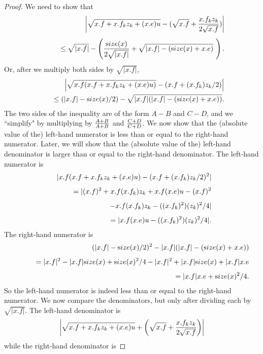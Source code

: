 {\begin{proof}{}
We need to show that 
\begin{eqnarray*}
&&\hskip-35pt \left|\sqrt {x.f + x.f_k z_k + (x.e) u} - (\sqrt{x.f} + {x.f_k z_k\over 2 \sqrt {x.f}})\right|\\[4pt]
&&\qquad \le \sqrt{|x.f|} - \left({{\textrm size}(x) \over 2 \sqrt {|x.f|}} + \sqrt {|x.f| - ({\textrm size}(x) + x.e)}\ \right).
\end{eqnarray*}
Or, after we multiply both sides by $\sqrt {|x.f|}$,  
\begin{eqnarray*}
&&
\hskip-35pt\left| \sqrt {x.f (x.f + x.f_k z_k + (x.e) u)} - (x.f + (x.f_k) z_k /2) \right|\\
&&\quad \le \left( |x.f| - {\textrm size}(x) /2\right) - \sqrt {|x.f|(|x.f| - ({\textrm size}(x) +
x.e))}.
\end{eqnarray*}
 The two  sides of the inequality are of the form $ A - B$ and $C - D$, and we
``simplify" by multiplying by  
${ A+ B \over A + B}$ and ${ C+ D \over C + D}$.   We now show that the (absolute value of the) left-hand numerator is less than or equal to the right-hand numerator.  Later, we will show that the (absolute value of the) left-hand denominator is larger than or equal to the right-hand denominator. 
The   left-hand numerator is 
\begin{eqnarray*}
&&\hskip-35pt |x.f (x.f + x.f_k z_k + (x.e) u) - (x.f + (x.f_k) z_k /2)^2|\\[4pt]
&&\qquad 
 = |(x.f)^ 2 + x.f (x.f_k) z_k + x.f (x.e) u - (x.f)^2\\[4pt]
&&\qquad\quad - x.f (x.f_k) z_k - ((x.f_k)^2) (z_k)^2/4|\\[4pt]
&&\qquad = |x.f (x.e) u - ((x.f_k)^2) (z_k)^2/4|.
\end{eqnarray*}
The right-hand numerator is 
\begin{eqnarray*}
&&(|x.f| - {\textrm size}(x)/2)^2 - |x.f| (|x.f| - ({\textrm size}(x) + x.e))\\[4pt]
&&\qquad = |x.f|^2 - |x.f| {\textrm size}(x) + {\textrm size}(x)^2/4 - |x.f|^2 + |x.f| {\mathrm
size}(x) + |x.f| x.e\\[4pt]
&&\qquad = |x.f| x.e + {\textrm size}(x)^2/4.
\end{eqnarray*}
So the left-hand numerator is indeed less than or equal to the right-hand numerator.
We now compare the denominators, but only after dividing each by
$\sqrt {|x.f|}$. 
The left-hand denominator is
$$\left|\sqrt {x.f + x.f_k z_k + (x.e) u} + 
\left(\sqrt {x.f} + {x.f_k z_k\over 2 \sqrt{x.f}}\right)\right|$$
while the right-hand denominator is 

\end{proof}}
